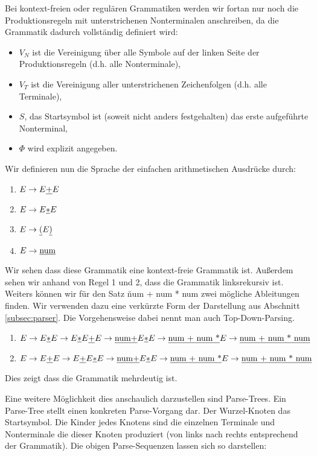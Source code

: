 Bei kontext-freien oder regulären Grammatiken werden wir fortan nur noch die Produktionsregeln mit unterstrichenen Nonterminalen anschreiben, da die Grammatik dadurch vollständig definiert wird:
\begin{itemize}
\item $V_N$ ist die Vereinigung über alle Symbole auf der linken Seite der Produktionsregeln (d.h. alle Nonterminale),
\item $V_T$ ist die Vereinigung aller unterstrichenen Zeichenfolgen (d.h. alle Terminale),
\item $S$, das Startsymbol ist (soweit nicht anders festgehalten) das erste aufgeführte Nonterminal,
\item $\Phi$ wird explizit angegeben.
\end{itemize}

Wir definieren nun die Sprache der einfachen arithmetischen Ausdrücke durch:
\begin{enumerate}
\item $E \to E \underline{+} E$
\item $E \to E \underline{*} E$
\item $E \to \underline{(} E \underline{)}$
\item $E \to \underline{\text{num}}$
\end{enumerate}

Wir sehen dass diese Grammatik eine kontext-freie Grammatik ist. Außerdem sehen wir anhand von Regel 1 und 2, dass die Grammatik linksrekursiv ist.
Weiters können wir für den Satz \u{num + num * num} zwei mögliche Ableitungen finden. Wir verwenden dazu eine verkürzte Form der Darstellung aus Abschnitt \ref{subsec:parser}.
Die Vorgehensweise dabei nennt man auch Top-Down-Parsing.
\begin{enumerate}
\item $E \to E \underline{*} E \to E \underline{*} E \underline{+} E\to\underline{\text{num+}}E\underline{*}E\to\underline{\text{num + num *}}E \to \underline{\text{num + num * num}}$
\item $E \to E \underline{+} E \to E \underline{+} E \underline{*} E\to\underline{\text{num+}}E\underline{*}E\to\underline{\text{num + num *}}E \to \underline{\text{num + num * num}}$
\end{enumerate}
Dies zeigt dass die Grammatik mehrdeutig ist.

Eine weitere Möglichkeit dies anschaulich darzustellen sind Parse-Trees. Ein Parse-Tree stellt einen konkreten Parse-Vorgang dar. Der Wurzel-Knoten das Startsymbol. Die Kinder jedes Knotens sind die einzelnen Terminale und Nonterminale die dieser Knoten produziert (von links nach rechts entsprechend der Grammatik). Die obigen Parse-Sequenzen lassen sich so darstellen:


